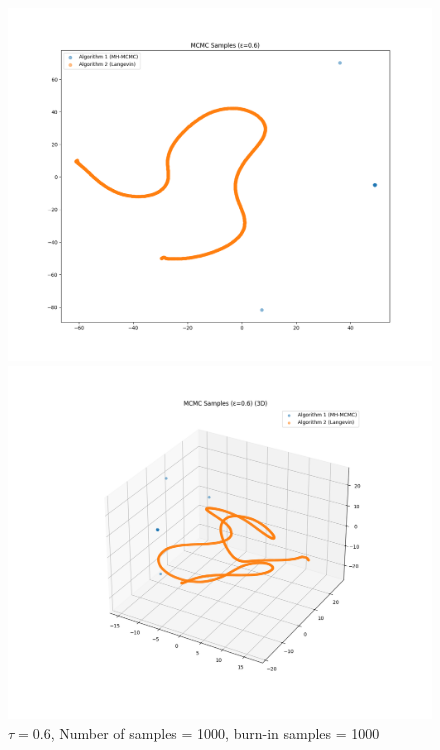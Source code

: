 \documentclass[a4paper,12pt]{article}
\begin{document}
\begin{figure}[H]
  \centering
  \begin{minipage}{0.38\textwidth}
    \includegraphics[width=\linewidth]{TASK-0-1/images/samples_eps0.6_n1000_burn500_tsne_2d.png}
  \end{minipage}
  \hfill
  \begin{minipage}{0.38\textwidth}
    \includegraphics[width=\linewidth]{TASK-0-1/images/samples_eps0.6_n1000_burn1000_tsne_3d.png}
  \end{minipage}
  \caption{$\tau = 0.6$, Number of samples = 1000, burn-in samples = 1000}
\end{figure}
\end{document}
